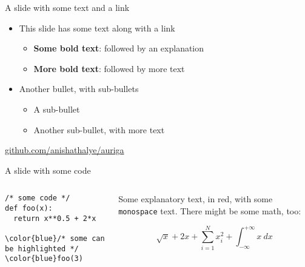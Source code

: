 \documentclass[11pt,aspectratio=169]{beamer}
\begin{document}
\begin{frame}{A slide with some text and a link}

  \begin{itemize}
    \item This slide has some text along with a link
      \begin{itemize}
        \item \textbf{Some bold text}: followed by an explanation
        \item \textbf{More bold text}: followed by more text
      \end{itemize}
    \item Another bullet, with sub-bullets
      \begin{itemize}
        \item A sub-bullet
        \item Another sub-bullet, with more text
      \end{itemize}
  \end{itemize}

  \vspace{2ex}
  \begin{center}
    \color{blue} \href{https://github.com/anishathalye/auriga}{github.com/anishathalye/auriga}
  \end{center}

\end{frame}

\begin{frame}[fragile]{A slide with some code}

	\begin{columns}
		\begin{column}{0.5\linewidth}
			\footnotesize
			\begin{Verbatim}[commandchars=\\\{\}]
/* some code */
def foo(x):
  return x**0.5 + 2*x

\color{blue}/* some can be highlighted */
\color{blue}foo(3)
      \end{Verbatim}
    \end{column}
    \begin{column}{0.5\linewidth}
      {\color{red} Some explanatory text, in red, with some \texttt{monospace} text.}
      There might be some math, too:

      $$\sqrt{x} + 2x + \sum_{i=1}^{N} x_i^2 + \int_{-\infty}^{+\infty}x~dx$$
    \end{column}
  \end{columns}

\end{frame}
\end{document}
